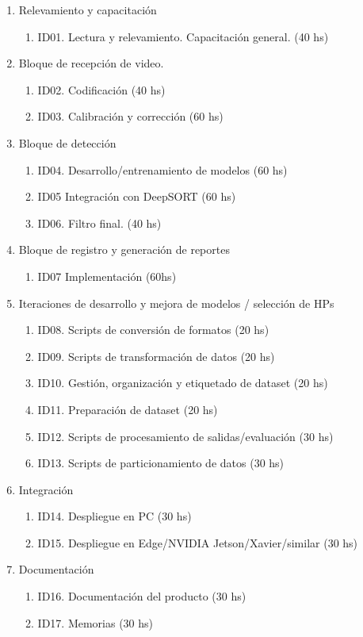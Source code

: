 \documentclass[11pt]{charter}
\begin{document}
\begin{enumerate}
\item Relevamiento y capacitación
	\begin{enumerate}
		\item ID01. Lectura y relevamiento. Capacitación general. (40 hs)
	\end{enumerate}
\item Bloque de recepción de video.
	\begin{enumerate}
	\item ID02. Codificación (40 hs)
	\item ID03. Calibración y corrección (60 hs)
	\end{enumerate}
\item Bloque de detección
	\begin{enumerate}
	\item ID04. Desarrollo/entrenamiento de modelos (60 hs)
	\item ID05 Integración con DeepSORT (60 hs)
	\item ID06. Filtro final. (40 hs)
	\end{enumerate}
\item Bloque de registro y generación de reportes
	\begin{enumerate}
	\item ID07 Implementación (60hs)
	\end{enumerate}
\item Iteraciones de desarrollo y mejora de modelos / selección de HPs
	\begin{enumerate}
		\item ID08. Scripts de conversión de formatos (20 hs)
		\item ID09. Scripts de transformación de datos (20 hs)
		\item ID10. Gestión, organización y etiquetado de dataset (20 hs)
		\item ID11. Preparación de dataset (20 hs)
		\item ID12. Scripts de procesamiento de salidas/evaluación (30 hs)
		\item ID13. Scripts de particionamiento de datos (30 hs)
	\end{enumerate}	
\item Integración
	\begin{enumerate}
		\item ID14. Despliegue en PC (30 hs)
		\item ID15. Despliegue en Edge/NVIDIA Jetson/Xavier/similar (30 hs)
	\end{enumerate}	
\item Documentación
	\begin{enumerate}
	\item ID16. Documentación del producto (30 hs)
	\item ID17. Memorias (30 hs)
	\end{enumerate}		
\end{enumerate}
\end{document}
